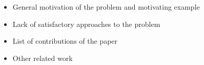 \begin{itemize}
\item General motivation of the problem and motivating example
\item Lack of satisfactory approaches to the problem
\item List of contributions of the paper
\item Other related work
\end{itemize}